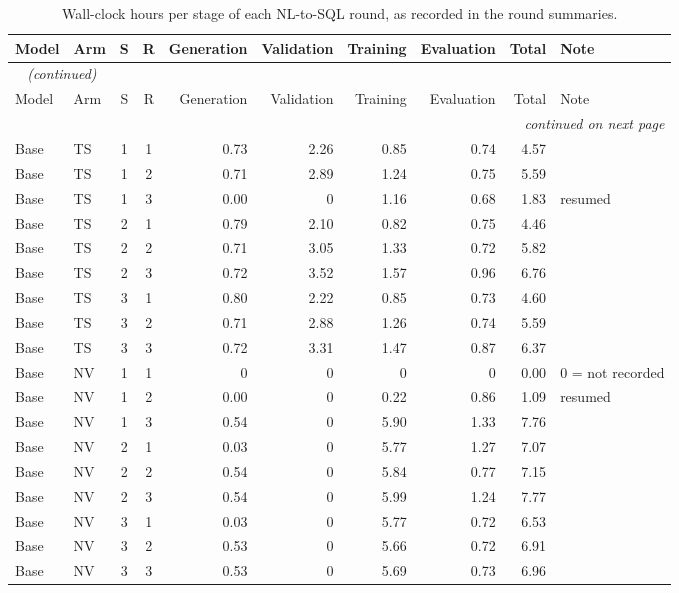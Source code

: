 {\footnotesize
{}
\setlength{\tabcolsep}{4.2pt}
\begin{longtable}{@{}llccrrrrrl@{}}
\caption{Wall-clock hours per stage of each NL-to-SQL round, as recorded in the round summaries.}\label{tab:gen-timings}\\
\toprule
\rowcolor{headshade}Model & Arm & S & R & Generation & Validation & Training & Evaluation & Total & Note\\
\midrule
\endfirsthead
\multicolumn{10}{l}{\textit{\tablename~\thetable{} (continued)}}\\
\toprule
\rowcolor{headshade}Model & Arm & S & R & Generation & Validation & Training & Evaluation & Total & Note\\
\midrule
\endhead
\midrule
\multicolumn{10}{r}{\textit{continued on next page}}\\
\endfoot
\bottomrule
\endlastfoot
Base & TS & 1 & 1 & 0.73 & 2.26 & 0.85 & 0.74 & 4.57 & \\
Base & TS & 1 & 2 & 0.71 & 2.89 & 1.24 & 0.75 & 5.59 & \\
Base & TS & 1 & 3 & 0.00 & 0 & 1.16 & 0.68 & 1.83 & resumed\\
Base & TS & 2 & 1 & 0.79 & 2.10 & 0.82 & 0.75 & 4.46 & \\
Base & TS & 2 & 2 & 0.71 & 3.05 & 1.33 & 0.72 & 5.82 & \\
Base & TS & 2 & 3 & 0.72 & 3.52 & 1.57 & 0.96 & 6.76 & \\
Base & TS & 3 & 1 & 0.80 & 2.22 & 0.85 & 0.73 & 4.60 & \\
Base & TS & 3 & 2 & 0.71 & 2.88 & 1.26 & 0.74 & 5.59 & \\
Base & TS & 3 & 3 & 0.72 & 3.31 & 1.47 & 0.87 & 6.37 & \\
Base & NV & 1 & 1 & 0 & 0 & 0 & 0 & 0.00 & 0 = not recorded\\
Base & NV & 1 & 2 & 0.00 & 0 & 0.22 & 0.86 & 1.09 & resumed\\
Base & NV & 1 & 3 & 0.54 & 0 & 5.90 & 1.33 & 7.76 & \\
Base & NV & 2 & 1 & 0.03 & 0 & 5.77 & 1.27 & 7.07 & \\
Base & NV & 2 & 2 & 0.54 & 0 & 5.84 & 0.77 & 7.15 & \\
Base & NV & 2 & 3 & 0.54 & 0 & 5.99 & 1.24 & 7.77 & \\
Base & NV & 3 & 1 & 0.03 & 0 & 5.77 & 0.72 & 6.53 & \\
Base & NV & 3 & 2 & 0.53 & 0 & 5.66 & 0.72 & 6.91 & \\
Base & NV & 3 & 3 & 0.53 & 0 & 5.69 & 0.73 & 6.96 & \\

\end{longtable}}
